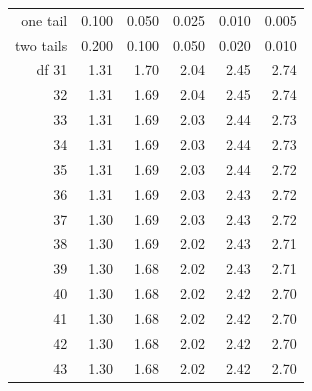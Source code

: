 \begin{center}
\begin{tabular}{r | rrr rr}
\hline
one tail & \hspace{1.5mm}  0.100 & \hspace{1.5mm} 0.050 & \hspace{1.5mm} 0.025 & \hspace{1.5mm} 0.010 & \hspace{1.5mm} 0.005  \\
two tails & 0.200 & 0.100 & 0.050 & 0.020 & 0.010 \\
\hline
{df} \hfill 31  &  {\normalsize  1.31} & {\normalsize  1.70} & {\normalsize  2.04} & {\normalsize  2.45} & {\normalsize  2.74}  \\ 
32  &  {\normalsize  1.31} & {\normalsize  1.69} & {\normalsize  2.04} & {\normalsize  2.45} & {\normalsize  2.74}  \\ 
33  &  {\normalsize  1.31} & {\normalsize  1.69} & {\normalsize  2.03} & {\normalsize  2.44} & {\normalsize  2.73}  \\ 
34  &  {\normalsize  1.31} & {\normalsize  1.69} & {\normalsize  2.03} & {\normalsize  2.44} & {\normalsize  2.73}  \\ 
35  &  {\normalsize  1.31} & {\normalsize  1.69} & {\normalsize  2.03} & {\normalsize  2.44} & {\normalsize  2.72}  \\ 
\hline
36  &  {\normalsize  1.31} & {\normalsize  1.69} & {\normalsize  2.03} & {\normalsize  2.43} & {\normalsize  2.72}  \\ 
37  &  {\normalsize  1.30} & {\normalsize  1.69} & {\normalsize  2.03} & {\normalsize  2.43} & {\normalsize  2.72}  \\ 
38  &  {\normalsize  1.30} & {\normalsize  1.69} & {\normalsize  2.02} & {\normalsize  2.43} & {\normalsize  2.71}  \\ 
39  &  {\normalsize  1.30} & {\normalsize  1.68} & {\normalsize  2.02} & {\normalsize  2.43} & {\normalsize  2.71}  \\ 
40  &  {\normalsize  1.30} & {\normalsize  1.68} & {\normalsize  2.02} & {\normalsize  2.42} & {\normalsize  2.70}  \\ 
\hline
\hline
41  &  {\normalsize  1.30} & {\normalsize  1.68} & {\normalsize  2.02} & {\normalsize  2.42} & {\normalsize  2.70}  \\ 
42  &  {\normalsize  1.30} & {\normalsize  1.68} & {\normalsize  2.02} & {\normalsize  2.42} & {\normalsize  2.70}  \\ 
43  &  {\normalsize  1.30} & {\normalsize  1.68} & {\normalsize  2.02} & {\normalsize  2.42} & {\normalsize  2.70}  \\ 

\end{tabular}
\end{center}
